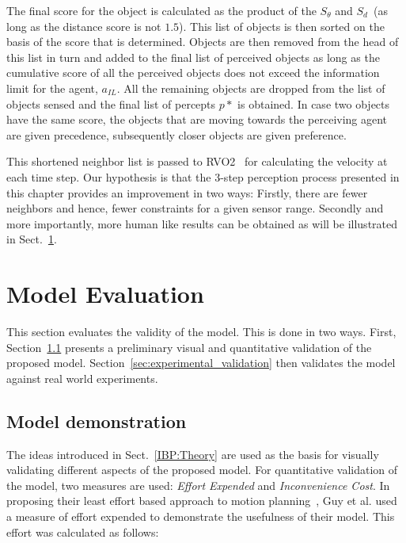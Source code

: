 The final score for the object is calculated as the product of the $S_{\theta}$ and $S_d$~(as long as the distance score is not $1.5$). This list of objects is then sorted on the basis of the score that is determined. Objects are then removed from the head of this list in turn and added to the final list of perceived objects as long as the cumulative score of all the perceived objects does not exceed the information limit for the agent, $a_{IL}$. All the remaining objects are dropped from the list of objects sensed and the final list of percepts $p*$ is obtained. In case two objects have the same score, the objects that are moving towards the perceiving agent are given precedence, subsequently closer objects are given preference.

This shortened neighbor list is passed to RVO2~\cite{Guy:2010ko} for calculating the velocity at each time step. Our hypothesis is that the 3-step perception process presented in this chapter provides an improvement in two ways: Firstly, there are fewer neighbors and hence, fewer constraints for a given sensor range. Secondly and more importantly, more human like results can be obtained as will be illustrated in Sect.~\ref{IBP:Results}.

\section{Model Evaluation}
\label{IBP:Results}

This section evaluates the validity of the model. This is done in two ways. First, Section~\ref{sec:model_demonstration} presents a preliminary visual and quantitative validation of the proposed model.
Section~\ref{sec:experimental_validation} then validates the model against real world experiments.

\subsection{Model demonstration} %
\label{sec:model_demonstration}


The ideas introduced in Sect.~\ref{IBP:Theory} are used as the basis for visually validating different aspects of the proposed model. For quantitative validation of the model, two measures are used: \emph{Effort Expended} and \emph{Inconvenience Cost}. In proposing their least effort based approach to motion planning~\cite{Guy:2010uv}, Guy et al. used a measure of effort expended to demonstrate the usefulness of their model. This effort was calculated as follows:


